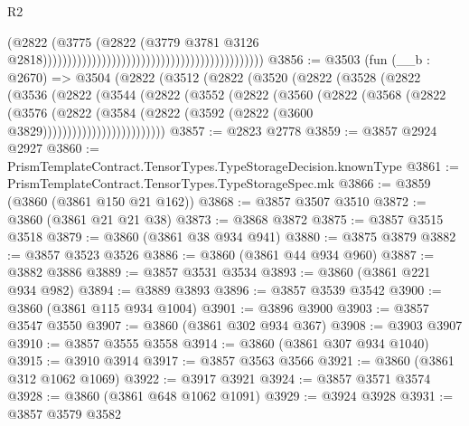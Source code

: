 \begin{lexlean}{R2}
\begin{coremodule}
                                                                                      (@2822
                                                                                        (@3775
                                                                                          (@2822
                                                                                            (@3779
                                                                                              @3781
                                                                                              @3126
                                                                                              @2818)))))))))))))))))))))))))))))))))))))))))))))
@3856 := @3503
    (fun (__b : @2670) =>
    @3504
      (@2822
        (@3512
          (@2822
            (@3520
              (@2822
                (@3528
                  (@2822
                    (@3536
                      (@2822
                        (@3544
                          (@2822
                            (@3552
                              (@2822
                                (@3560
                                  (@2822
                                    (@3568
                                      (@2822
                                        (@3576
                                          (@2822
                                            (@3584
                                              (@2822
                                                (@3592 (@2822 (@3600 @3829)))))))))))))))))))))))))
@3857 := @2823 @2778
@3859 := @3857 @2924 @2927
@3860 := PrismTemplateContract.TensorTypes.TypeStorageDecision.knownType
@3861 := PrismTemplateContract.TensorTypes.TypeStorageSpec.mk
@3866 := @3859 (@3860 (@3861 @150 @21 @162))
@3868 := @3857 @3507 @3510
@3872 := @3860 (@3861 @21 @21 @38)
@3873 := @3868 @3872
@3875 := @3857 @3515 @3518
@3879 := @3860 (@3861 @38 @934 @941)
@3880 := @3875 @3879
@3882 := @3857 @3523 @3526
@3886 := @3860 (@3861 @44 @934 @960)
@3887 := @3882 @3886
@3889 := @3857 @3531 @3534
@3893 := @3860 (@3861 @221 @934 @982)
@3894 := @3889 @3893
@3896 := @3857 @3539 @3542
@3900 := @3860 (@3861 @115 @934 @1004)
@3901 := @3896 @3900
@3903 := @3857 @3547 @3550
@3907 := @3860 (@3861 @302 @934 @367)
@3908 := @3903 @3907
@3910 := @3857 @3555 @3558
@3914 := @3860 (@3861 @307 @934 @1040)
@3915 := @3910 @3914
@3917 := @3857 @3563 @3566
@3921 := @3860 (@3861 @312 @1062 @1069)
@3922 := @3917 @3921
@3924 := @3857 @3571 @3574
@3928 := @3860 (@3861 @648 @1062 @1091)
@3929 := @3924 @3928
@3931 := @3857 @3579 @3582

\end{coremodule}
\end{lexlean}
